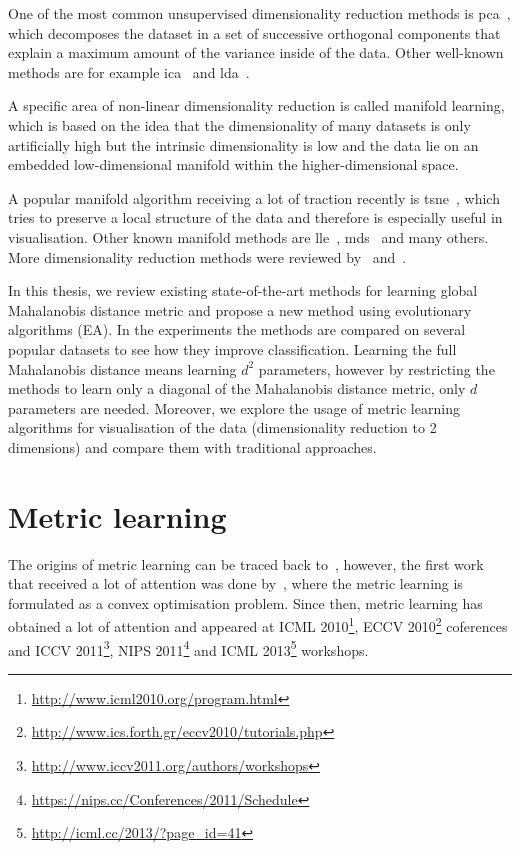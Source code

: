 \documentclass[12pt,a4paper]{report}
\begin{document}
One of the most common unsupervised dimensionality reduction methods is \ac{pca}~\citep{jolliffe1986principal}, which decomposes the dataset in a set of successive orthogonal components that explain a maximum amount of the variance inside of the data. Other well-known methods are for example \ac{ica}~\citep{comon1994independent} and \ac{lda}~\citep{fisher1936use}.

A specific area of non-linear dimensionality reduction is called manifold learning, which is based on the idea that the dimensionality of many datasets is only artificially high but the intrinsic dimensionality is low and the data lie on an embedded low-dimensional manifold within the higher-dimensional space.

A popular manifold algorithm receiving a lot of traction recently is \ac{tsne}~\citep{maaten2008visualizing}, which tries to preserve a local structure of the data and therefore is especially useful in visualisation. Other known manifold methods are \ac{lle}~\citep{roweis2000nonlinear}, \ac{mds}~\citep{kruskal1978multidimensional} and many others. More dimensionality reduction methods were reviewed by~\citep{fodor2002survey} and~\citep{van2009dimensionality}.

In this thesis, we review existing state-of-the-art methods for learning global Mahalanobis distance metric and propose a new method using evolutionary algorithms (EA). In the experiments the methods are compared on several popular datasets to see how they improve classification. Learning the full Mahalanobis distance means learning $d^2$ parameters, however by restricting the methods to learn only a diagonal of the Mahalanobis distance metric, only $d$ parameters are needed. Moreover, we explore the usage of metric learning algorithms for visualisation of the data (dimensionality reduction to 2 dimensions) and compare them with traditional approaches.

\section{Metric learning} \label{chap:intro:ml}

The origins of metric learning can be traced back to~\citep{short1981optimal}, however, the first work that received a lot of attention was done by~\citep{xing2002distance}, where the metric learning is formulated as a convex optimisation problem. Since then, metric learning has obtained a lot of attention and appeared at ICML 2010\footnote{\url{http://www.icml2010.org/program.html}}, ECCV 2010\footnote{\url{http://www.ics.forth.gr/eccv2010/tutorials.php}} coferences and ICCV 2011\footnote{\url{http://www.iccv2011.org/authors/workshops}}, NIPS 2011\footnote{\url{https://nips.cc/Conferences/2011/Schedule}} and ICML 2013\footnote{\url{http://icml.cc/2013/?page_id=41}} workshops.
\end{document}
